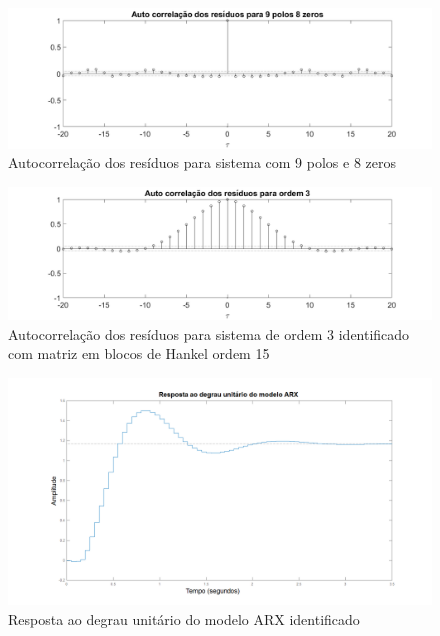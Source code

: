 \begin{figure}[H]
	\centering
	\includegraphics[width=1.1\linewidth]{autocorrelacao98}
	\caption[Autocorrelação dos resíduos para sistema com 9 polos e 8 zeros]{Autocorrelação dos resíduos para sistema com 9 polos e 8 zeros}
	\label{fig:autocorrelacao98}
\end{figure}

\begin{figure}[H]
	\centering
	\includegraphics[width=1.1\linewidth]{autocorrelacao315}
	\caption[Autocorrelação dos resíduos para sistema de ordem 3]{Autocorrelação dos resíduos para sistema de ordem 3 identificado com matriz em blocos de Hankel ordem 15}
	\label{fig:autocorrelacao315}
\end{figure}

\begin{figure}[H]
	\centering
	\includegraphics[width=1\linewidth]{respostadegrauarx}
	\caption[Resposta ao degrau do modelo ARX]{Resposta ao degrau unitário do modelo ARX identificado}
	\label{fig:respostadegrauarx}
\end{figure}


